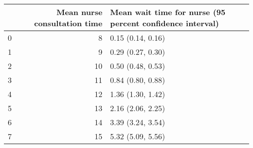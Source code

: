 \begin{tabular}{lrl}
\toprule
 & Mean nurse consultation time & Mean wait time for nurse (95 percent confidence interval) \\
\midrule
0 & 8 & 0.15 (0.14, 0.16) \\
1 & 9 & 0.29 (0.27, 0.30) \\
2 & 10 & 0.50 (0.48, 0.53) \\
3 & 11 & 0.84 (0.80, 0.88) \\
4 & 12 & 1.36 (1.30, 1.42) \\
5 & 13 & 2.16 (2.06, 2.25) \\
6 & 14 & 3.39 (3.24, 3.54) \\
7 & 15 & 5.32 (5.09, 5.56) \\
\bottomrule
\end{tabular}
